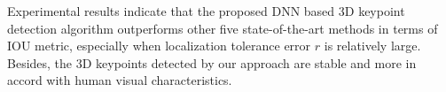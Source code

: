 \documentclass[runningheads]{article}
\begin{document}
Experimental results indicate that the proposed DNN based 3D keypoint detection algorithm outperforms other five state-of-the-art methods in terms of IOU metric, especially when localization tolerance error \emph{$r$} is relatively large. Besides, the 3D keypoints detected by our approach are stable and more in accord with human visual characteristics.



\end{document}
